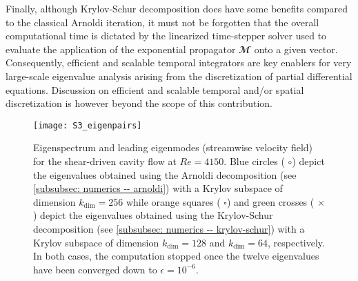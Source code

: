     Finally, although Krylov-Schur decomposition does have some benefits compared to the classical Arnoldi iteration, it must not be forgotten that the overall computational time is dictated by the linearized time-stepper solver used to evaluate the application of the exponential propagator $\mathbfcal{M}$ onto a given vector. Consequently, efficient and scalable temporal integrators are key enablers for very large-scale eigenvalue analysis arising from the discretization of partial differential equations. Discussion on efficient and scalable temporal and/or spatial discretization is however beyond the scope of this contribution.

    \begin{figure}
      \centering
      \texttt{[image: S3\_eigenpairs]}
      \caption{Eigenspectrum and leading eigenmodes (streamwise velocity field) for the shear-driven cavity flow at $Re=4150$. Blue circles ({\color{blue} $\boldsymbol{\circ}$}) depict the eigenvalues obtained using the Arnoldi decomposition (see \textsection \ref{subsubsec: numerics -- arnoldi}) with a Krylov subspace of dimension $k_{\mathrm{dim}} = 256$ while orange squares ({\color{orange} $\square$}) and green crosses ({\color{green} $\times$}) depict the eigenvalues obtained using the Krylov-Schur decomposition (see \textsection \ref{subsubsec: numerics -- krylov-schur}) with a Krylov subspace of dimension $k_{\mathrm{dim}}=128$ and $k_{\mathrm{dim}} = 64$, respectively. In both cases, the computation stopped once the twelve eigenvalues have been converged down to $\epsilon = 10^{-6}$.}
      \label{fig: numerics -- linear stability eigenpairs}
    \end{figure}

